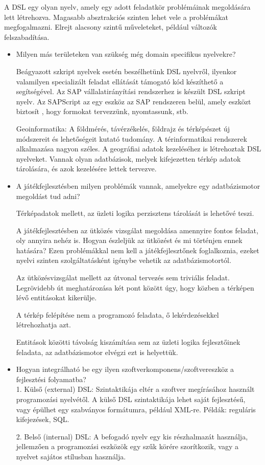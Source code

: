 
A DSL egy olyan nyelv, amely egy adott feladatkör problémáinak megoldására lett létrehozva. Magasabb absztrakciós szinten lehet vele a problémákat megfogalmazni.
Elrejt alacsony szintű műveleteket, például változók felszabadítása.

\begin{itemize}
\item Milyen más területeken van szükség még domain specifikus nyelvekre?

Beágyazott szkript nyelvek esetén beszélhetünk DSL nyelvről, ilyenkor valamilyen specializált feladat ellátását támogató kód készíthető a segítségével. Az SAP vállalatirányítási rendszerhez is készült DSL szkript nyelv. Az SAPScript az egy eszköz az SAP rendszeren belül, amely eszközt biztosít , hogy formokat tervezzünk, nyomtassunk, stb.

Geoinformatika: A földmérés, távérzékelés, földrajz és térképészet új módszereit és lehetőségeit kutató tudomány. A térinformatikai rendszerek alkalmazása nagyon széles. A geográfiai adatok kezeléséhez is létrehoztak DSL nyelveket. Vannak olyan adatbázisok, melyek kifejezetten térkép adatok tárolására, és azok kezelésére lettek tervezve.


\item A játékfejlesztésben milyen problémák vannak, amelyekre egy adatbázismotor megoldást tud adni?

Térképadatok mellett, az üzleti logika perzisztens tárolását is lehetővé teszi.

A játékfejlesztésben az ütközés vizsgálat megoldása amennyire fontos feladat, oly annyira nehéz is. Hogyan észleljük az ütközést és mi történjen ennek hatására?
Ezen problémákkal nem kell a játékfejlesztőnek foglalkoznia, ezeket nyelvi szinten szolgáltatásként igénybe vehetik az adatbázismotortól.

Az ütközésvizsgálat mellett az útvonal tervezés sem triviális feladat. Legrövidebb út meghatározása két pont között úgy, hogy közben a térképen lévő entitásokat kikerülje.

A térkép felépítése nem a programozó feladata, ő lekérdezésekkel létrehozhatja azt.

Entitások közötti távolság kiszámítása sem az üzleti logika fejlesztőinek feladata, az adatbázismotor elvégzi ezt is helyettük.



\item Hogyan integrálható be egy ilyen szoftverkomponens/szoftvereszköz a fejlesztési folyamatba? \\
1. Külső (external) DSL: Szintaktikája eltér a szoftver megírásához használt programozási nyelvétől. A külső DSL szintaktikája lehet saját fejlesztésű, vagy épülhet egy szabványos formátumra, például XML-re.
Példák: reguláris kifejezések, SQL.

2. Belső (internal) DSL: A befogadó nyelv egy kis részhalmazát használja, jellemzően a programozási eszközök egy szűk körére szorítkozik, vagy a nyelvet sajátos stílusban használja.
\end{itemize}